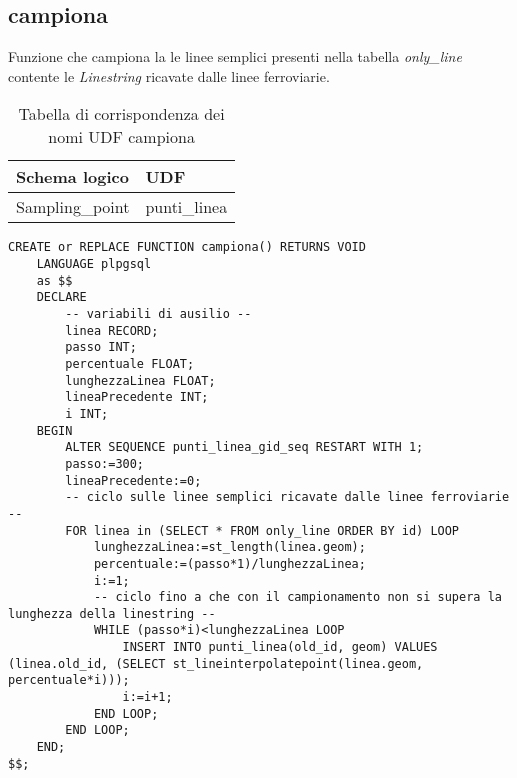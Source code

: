 \subsection{campiona}
Funzione che campiona la le linee semplici presenti nella tabella \textit{only\_line} contente le \textit{Linestring} ricavate dalle linee ferroviarie.\\


\begin{table}[h]
\centering
\caption{Tabella di corrispondenza dei nomi UDF campiona}
\label{mapTb3}
\begin{tabular}{|l|l|}
\hline
Schema logico       & UDF                \\ \hline
Sampling\_point          & punti\_linea              \\ \hline
\end{tabular}
\end{table}

\begin{lstlisting}[style=mySQL]
CREATE or REPLACE FUNCTION campiona() RETURNS VOID
	LANGUAGE plpgsql
	as $$
	DECLARE
		-- variabili di ausilio --
		linea RECORD;
		passo INT;
		percentuale FLOAT;
		lunghezzaLinea FLOAT;
		lineaPrecedente INT;
		i INT;
	BEGIN
		ALTER SEQUENCE punti_linea_gid_seq RESTART WITH 1;
		passo:=300;
		lineaPrecedente:=0;
		-- ciclo sulle linee semplici ricavate dalle linee ferroviarie --
		FOR linea in (SELECT * FROM only_line ORDER BY id) LOOP
			lunghezzaLinea:=st_length(linea.geom);
			percentuale:=(passo*1)/lunghezzaLinea;
			i:=1;
			-- ciclo fino a che con il campionamento non si supera la lunghezza della linestring --
			WHILE (passo*i)<lunghezzaLinea LOOP
				INSERT INTO punti_linea(old_id, geom) VALUES (linea.old_id, (SELECT st_lineinterpolatepoint(linea.geom, percentuale*i)));
				i:=i+1;
			END LOOP;
		END LOOP;
	END;
$$;
\end{lstlisting}